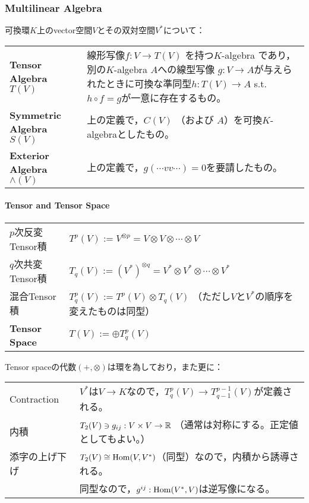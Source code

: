 \subsubsection{Multilinear Algebra}
可換環$K$上のvector空間$V$とその双対空間$V^*$について：\vspace{.6zw}\par
\begin{tabular}{l@{ :\ \ \ }l}
{\bf Tensor Algebra} $T(V)$
    & \begin{minipage}[t]{280pt}
       線形写像$f: V\to T(V)$ を持つ$K$-algebra であり，別の$K$-algebra $A$への線型写像 $g: V\to A$が与えられたときに可換な準同型$h:T(V)\to A$ s.t. $h\circ f=g$が一意に存在するもの。
      \end{minipage}\vspace{.5zw}\\
{\bf Symmetric Algebra} $S(V)$
    & 上の定義で，$C(V)$ （および $A$）を可換$K$-algebraとしたもの。\\
{\bf Exterior Algebra} $\wedge(V)$
    & 上の定義で，$g(\cdots vv\cdots)=0$を要請したもの。
\end{tabular}

\vspace{1zw}

\paragraph{Tensor and Tensor Space}\mbox{}\par
\begin{tabular}{l@{ :\ \ \ }l}
$p$次反変Tensor積 & $T^p(V):=V^{\otimes p} = V\otimes V\otimes \cdots \otimes V$\\
$q$次共変Tensor積 & $T_q(V):=(V^*)^{\otimes q} = V^*\otimes V^*\otimes \cdots \otimes V^*$\\
混合Tensor積      & $T^p_q(V):=T^p(V)\otimes T_q(V)$ （ただし$V$と$V^*$の順序を変えたものは同型）\\
{\bf Tensor Space}& $T(V):=\oplus T^p_q(V)$
\end{tabular}\vspace{.5zw}

Tensor spaceの代数$(+,\otimes)$は環を為しており，また更に：\vspace{.2zw}\par
\begin{tabular}{l@{ :\ \ \ }l}
Contraction    & $V^*$は$V\to K$なので，$T^p_q(V)\to T^{p-1}_{q-1}(V)$が定義される。\\
内積           & $T_2(V)\ni g_{ij}: V\times V\to \mathbb R$ （通常は対称にする。正定値としてもよい。）\\
添字の上げ下げ & $T_2(V)\cong\mathop{\mathrm{Hom}}(V,V^*)$（同型）なので，内積から誘導される。\\
               & 同型なので，$g^{ij}: \mathop{\mathrm{Hom}}(V^*,V)$は逆写像になる。
\end{tabular}


